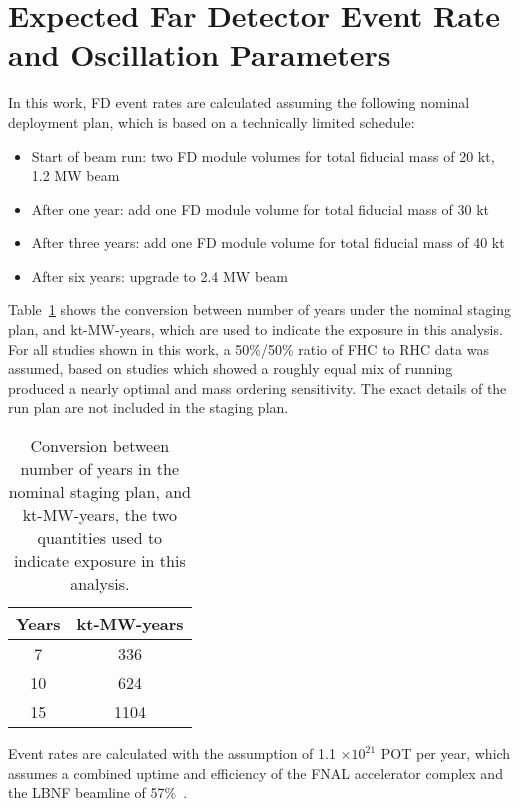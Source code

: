 \section{Expected Far Detector Event Rate and Oscillation Parameters}
\label{sec:rate}

In this work, FD event rates are calculated assuming the following nominal deployment plan, which is based on a technically limited schedule:
\begin{itemize}
    \item Start of beam run: two FD module
    volumes for total fiducial mass of 20 kt, 1.2 MW beam
    \item After one year: add one FD module  volume for total fiducial mass of 30 kt
    \item After three years: add one FD module  volume for total fiducial mass of 40 kt
    \item After six years: upgrade to 2.4 MW beam
\end{itemize}
Table~\ref{tab:exposures} shows the conversion between number of years under the nominal staging plan, and  kt-MW-years, which are used to indicate the exposure in this analysis. For all studies shown in this work, a 50\%/50\% ratio of FHC to RHC data was assumed, based on studies which showed a roughly equal mix of running produced a nearly optimal \deltacp and mass ordering sensitivity. The exact details of the run plan are not included in the staging plan.

\begin{table}[htbp]
  \centering
  \begin{tabular}{cc}
    \hline
    Years & kt-MW-years \\
    \hline\hline
    7 & 336 \\
    10 & 624 \\
    15 & 1104 \\
    \hline
  \end{tabular}
  \caption{Conversion between number of years in the nominal staging plan, and kt-MW-years, the two quantities used to indicate exposure in this analysis.}
  \label{tab:exposures}
\end{table}

Event rates are calculated with the assumption of 1.1 $\times 10^{21}$ POT per year, which assumes a combined uptime and efficiency of the FNAL accelerator complex and the LBNF beamline of 57\%~\cite{Abi:2020evt}.
